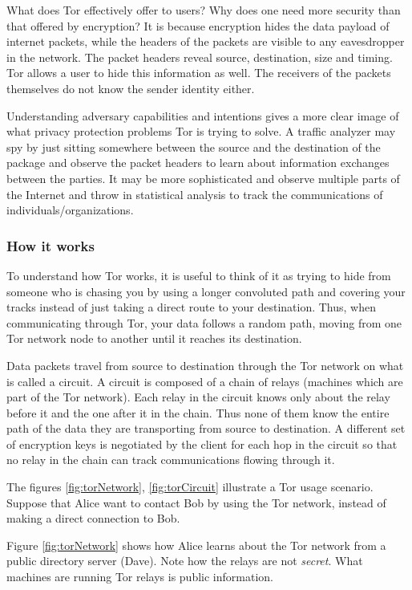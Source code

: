 \documentclass[11pt]{article} %
\begin{document}
What does Tor effectively offer to users? Why does one need more security than that offered by encryption? It is because encryption hides the data payload of internet packets, while the headers of the packets are visible to any eavesdropper in the network. The packet headers reveal source, destination, size and timing. Tor allows a user to hide this information as well. The receivers of the packets themselves do not know the sender identity either.

Understanding adversary capabilities and intentions gives a more clear image of what privacy protection problems Tor is trying to solve. A traffic analyzer may spy by just sitting somewhere between the source and the destination of the package and observe the packet headers to learn about information exchanges between the parties. It may be more sophisticated and observe multiple parts of the Internet and throw in statistical analysis to track the communications of individuals/organizations.

\subsubsection{How it works}

To understand how Tor works, it is useful to think of it as trying to hide from someone who is chasing you by using a longer convoluted path and covering your tracks instead of just taking a direct route to your destination. Thus, when communicating through Tor, your data follows a random path, moving from one Tor network node to another until it reaches its destination.

Data packets travel from source to destination through the Tor network on what is called a circuit. A circuit is composed of a chain of relays (machines which are part of the Tor network). Each relay in the circuit knows only about the relay before it and the one after it in the chain. Thus none of them know the entire path of the data they are transporting from source to destination. A different set of encryption keys is negotiated by the client for each hop in the circuit so that no relay in the chain can track communications flowing through it. \citep*{web:torOverview}

The figures \ref{fig:torNetwork}, \ref{fig:torCircuit} illustrate a Tor usage scenario. Suppose that Alice want to contact Bob by using the Tor network, instead of making a direct connection to Bob.

Figure \ref{fig:torNetwork} shows how Alice learns about the Tor network from a public directory server (Dave). Note how the relays are not \textit{secret}. What machines are running Tor relays is public information.
\end{document}
